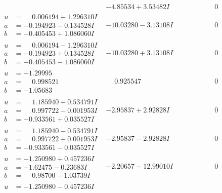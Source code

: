 \documentclass[1p]{elsarticle_modified}
\theoremstyle{definition}
\begin{document}
$$\begin{array}{c|c|c}
 & -4.85534 + 3.53482 I & \phantom{-0.000000 } 0 \\ \hline\begin{aligned}
u &= \phantom{-}0.006194 + 1.296310 I \\
a &= -0.194923 - 0.134528 I \\
b &= -0.405453 + 1.086060 I\end{aligned}
 & -10.03280 - 3.13108 I & \phantom{-0.000000 } 0 \\ \hline\begin{aligned}
u &= \phantom{-}0.006194 - 1.296310 I \\
a &= -0.194923 + 0.134528 I \\
b &= -0.405453 - 1.086060 I\end{aligned}
 & -10.03280 + 3.13108 I & \phantom{-0.000000 } 0 \\ \hline\begin{aligned}
u &= -1.29995\phantom{ +0.000000I} \\
a &= \phantom{-}0.998521\phantom{ +0.000000I} \\
b &= -1.05683\phantom{ +0.000000I}\end{aligned}
 & \phantom{-}0.925547\phantom{ +0.000000I} & \phantom{-0.000000 } 0 \\ \hline\begin{aligned}
u &= \phantom{-}1.185940 + 0.534791 I \\
a &= \phantom{-}0.997722 - 0.001953 I \\
b &= -0.933561 + 0.035527 I\end{aligned}
 & -2.95837 + 2.92828 I & \phantom{-0.000000 } 0 \\ \hline\begin{aligned}
u &= \phantom{-}1.185940 - 0.534791 I \\
a &= \phantom{-}0.997722 + 0.001953 I \\
b &= -0.933561 - 0.035527 I\end{aligned}
 & -2.95837 - 2.92828 I & \phantom{-0.000000 } 0 \\ \hline\begin{aligned}
u &= -1.250980 + 0.457236 I \\
a &= -1.62475 - 0.23683 I \\
b &= \phantom{-}0.98700 - 1.03739 I\end{aligned}
 & -2.20657 - 12.99010 I & \phantom{-0.000000 } 0 \\ \hline\begin{aligned}
u &= -1.250980 - 0.457236 I \\

\end{aligned}
\end{array}$$
\end{document}
